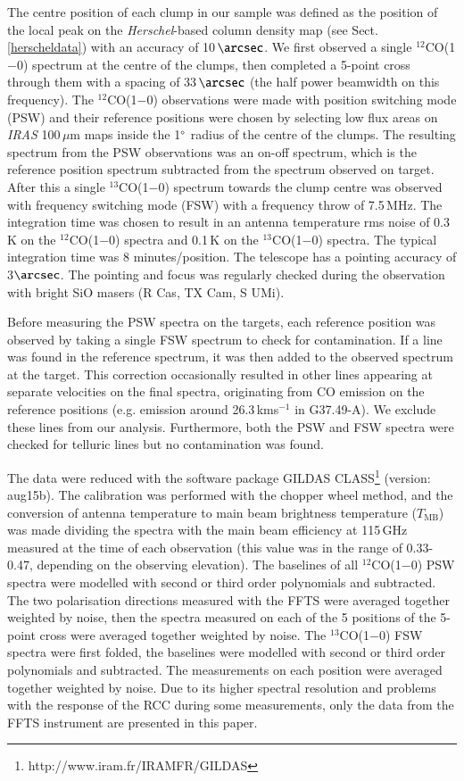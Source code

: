 \documentclass[printer]{aa}
\begin{document}
The centre position of each clump in our sample was defined as the position of the local peak on the \textit{Herschel}-based column density map (see Sect. \ref{herscheldata}) with an accuracy of 10\,$\arcsec$. We first observed a single $^{12}$CO(1$-$0) spectrum at the centre of the clumps, then completed a 5-point cross through them with a spacing of 33\,$\arcsec$ (the half power beamwidth on this frequency). The $^{12}$CO(1$-$0) observations were made with position switching mode (PSW) and their reference positions were chosen by selecting low flux areas on \textit{IRAS} 100\,$\mu$m maps inside the 1$\degree$ radius of the centre of the clumps. The resulting spectrum from the PSW observations was an on-off spectrum, which is the reference position spectrum subtracted from the spectrum observed on target. After this a single $^{13}$CO(1$-$0) spectrum towards the clump centre was observed with frequency switching mode (FSW) with a frequency throw of 7.5\,MHz. The integration time was chosen to result in an antenna temperature rms noise of 0.3\,K on the $^{12}$CO(1$-$0) spectra and 0.1\,K on the $^{13}$CO(1$-$0) spectra. The typical integration time was 8 minutes/position. The telescope has a pointing accuracy of 3$\arcsec$. The pointing and focus was regularly checked during the observation with bright SiO masers (R Cas, TX Cam, S UMi).

Before measuring the PSW spectra on the targets, each reference position was observed by taking a single FSW spectrum to check for contamination. If a line was found in the reference spectrum, it was then added to the observed spectrum at the target. This correction occasionally resulted in other lines appearing at separate velocities on the final spectra, originating from CO emission on the reference positions (e.g. emission around 26.3\,kms$^{-1}$ in G37.49-A). We exclude these lines from our analysis. Furthermore, both the PSW and FSW spectra were checked for telluric lines but no contamination was found.

The data were reduced with the software package GILDAS CLASS\footnote{http://www.iram.fr/IRAMFR/GILDAS} (version: aug15b). The calibration was performed with the chopper wheel method, and the conversion of antenna temperature to main beam brightness temperature ($T\mathrm{_{MB}}$) was made dividing the spectra with the main beam efficiency at 115\,GHz measured at the time of each observation (this value was in the range of 0.33-0.47, depending on the observing elevation). The baselines of all $^{12}$CO(1$-$0) PSW spectra were modelled with second or third order polynomials and subtracted. The two polarisation directions measured with the FFTS were averaged together weighted by noise, then the spectra measured on each of the 5 positions of the 5-point cross were averaged together weighted by noise. The $^{13}$CO(1$-$0) FSW spectra were first folded, the baselines were modelled with second or third order polynomials and subtracted. The measurements on each position were averaged together weighted by noise. Due to its higher spectral resolution and problems with the response of the RCC during some measurements, only the data from the FFTS instrument are presented in this paper. 
\end{document}
